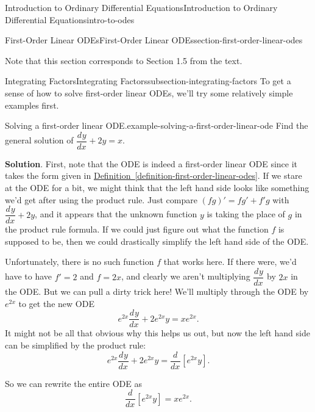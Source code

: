 \documentclass[oneside,10pt,]{book}
\numberwithin{equation}{section}
\newcommand{\dv}[3][]{\dfrac{d^{#1} #2}{d #3^{#1}}}
\begin{document}
\begin{chapterptx}{Introduction to Ordinary Differential Equations}{}{Introduction to Ordinary Differential Equations}{}{}{intro-to-odes}
\begin{sectionptx}{First-Order Linear ODEs}{}{First-Order Linear ODEs}{}{}{section-first-order-linear-odes}
\begin{introduction}{}
\par
\hypertarget{p-74}{}%
Note that this section corresponds to Section 1.5 from the text.%
\end{introduction}%
%
%
\typeout{************************************************}
\typeout{************************************************}
%
\begin{subsectionptx}{Integrating Factors}{}{Integrating Factors}{}{}{subsection-integrating-factors}
\hypertarget{p-75}{}%
To get a sense of how to solve first-order linear ODEs, we'll try some relatively simple examples first.%
\begin{example}{Solving a first-order linear ODE.}{example-solving-a-first-order-linear-ode}%
\hypertarget{p-76}{}%
Find the general solution of \(\dv{y}{x}+2y = x\).%
\par\smallskip%
\noindent\textbf{Solution}.\hypertarget{solution-13}{}\quad%
\hypertarget{p-77}{}%
First, note that the ODE is indeed a first-order linear ODE since it takes the form given in \hyperref[definition-first-order-linear-odes]{Definition~\ref{definition-first-order-linear-odes}}. If we stare at the ODE for a bit, we might think that the left hand side looks like something we'd get after using the product rule. Just compare \((fg)' = fg'+f'g\) with \(\dv{y}{x}+2y\), and it appears that the unknown function \(y\) is taking the place of \(g\) in the product rule formula. If we could just figure out what the function \(f\) is supposed to be, then we could drastically simplify the left hand side of the ODE.%
\par
\hypertarget{p-78}{}%
Unfortunately, there is no such function \(f\) that works here. If there were, we'd have to have \(f'=2\) and \(f=2x\), and clearly we aren't multiplying \(\dv{y}{x}\) by \(2x\) in the ODE. But we can pull a dirty trick here! We'll multiply through the ODE by \(e^{2x}\) to get the new ODE%
\begin{equation*}
e^{2x}\dv{y}{x}+2e^{2x}y = xe^{2x}.
\end{equation*}
It might not be all that obvious why this helps us out, but now the left hand side can be simplified by the product rule:%
\begin{equation*}
e^{2x}\dv{y}{x}+2e^{2x}y = \dv{}{x}[e^{2x}y].
\end{equation*}
%
\par
\hypertarget{p-79}{}%
So we can rewrite the entire ODE as%
\begin{equation*}
\dv{}{x}[e^{2x}y] = xe^{2x}.
\end{equation*}

\end{example}
\end{subsectionptx}
\end{sectionptx}
\end{chapterptx}
\end{document}
